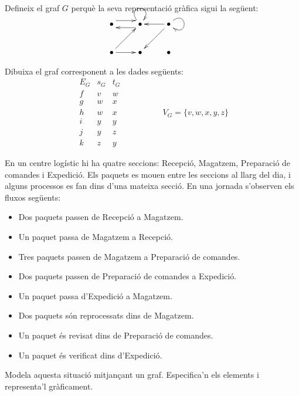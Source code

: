 \begin{exercici}
Defineix el graf $G$ perquè la seva representació gràfica sigui la següent:
\[
\xymatrix{
	\bullet \ar@<1ex>[r]  & \bullet \ar@<1ex>[l] \ar@(ul,ur)  & \bullet \ar[l] \ar@(ur,dr) \ar[dl] & \\
	\bullet \ar[ur] \ar[r]  & \bullet  & \bullet
}
\]
\end{exercici}

\begin{exercici}
Dibuixa el graf corresponent a les dades següents:
\[
    \begin{array}{c|c|c}
        E_G & s_G & t_G \\ \hline
        f & v & w \\
        g & w & x \\
        h & w & x \\
        i & y & y \\
        j & y & z \\
        k & z & y
    \end{array}
    \hspace{2cm} V_G=\{v,w,x,y,z\}
\]
\end{exercici}

\begin{exercici}
En un centre logístic hi ha quatre seccions: Recepció, Magatzem, Preparació de comandes i Expedició. Els paquets es mouen entre les seccions al llarg del dia, i alguns processos es fan dins d'una mateixa secció. En una jornada s'observen els fluxos següents:
\begin{itemize}
\item Dos paquets passen de Recepció a Magatzem.
\item Un paquet passa de Magatzem a Recepció.
\item Tres paquets passen de Magatzem a Preparació de comandes.
\item Dos paquets passen de Preparació de comandes a Expedició.
\item Un paquet passa d'Expedició a Magatzem.
\item Dos paquets són reprocessats dins de Magatzem.
\item Un paquet és revisat dins de Preparació de comandes.
\item Un paquet és verificat dins d'Expedició.
\end{itemize}
Modela aquesta situació mitjançant un graf. Especifica'n els elements i representa'l gràficament.
\end{exercici}


